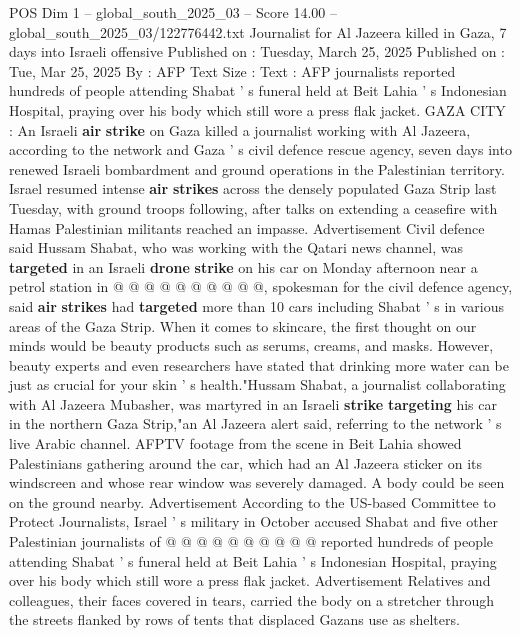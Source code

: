 \begin{textsample}{POS Dim 1 – global\_south\_2025\_03 – Score 14.00 – global\_south\_2025\_03/122776442.txt}  \label{ex:f1_pos_299}
Journalist for Al Jazeera killed in Gaza, 7 days into Israeli offensive Published on : Tuesday, March 25, 2025 Published on : Tue, Mar 25, 2025 By : AFP Text Size : Text : AFP journalists reported hundreds of people attending Shabat ' s funeral held at Beit Lahia ' s Indonesian Hospital, praying over his body which still wore a press flak jacket.
GAZA CITY : An Israeli \textbf{air} \textbf{strike} on Gaza killed a journalist working with Al Jazeera, according to the network and Gaza ' s civil defence rescue agency, seven days into renewed Israeli bombardment and ground operations in the Palestinian territory.
Israel resumed intense \textbf{air} \textbf{strikes} across the densely populated Gaza Strip last Tuesday, with ground troops following, after talks on extending a ceasefire with Hamas Palestinian militants reached an impasse.
Advertisement Civil defence said Hussam Shabat, who was working with the Qatari news channel, was \textbf{targeted} in an Israeli \textbf{drone} \textbf{strike} on his car on Monday afternoon near a petrol station in @ @ @ @ @ @ @ @ @ @, spokesman for the civil defence agency, said \textbf{air} \textbf{strikes} had \textbf{targeted} more than 10 cars including Shabat ' s in various areas of the Gaza Strip.
When it comes to skincare, the first thought on our minds would be beauty products such as serums, creams, and masks.
However, beauty experts and even researchers have stated that drinking more water can be just as crucial for your skin ' s health."Hussam Shabat, a journalist collaborating with Al Jazeera Mubasher, was martyred in an Israeli \textbf{strike} \textbf{targeting} his car in the northern Gaza Strip,"an Al Jazeera alert said, referring to the network ' s live Arabic channel.
AFPTV footage from the scene in Beit Lahia showed Palestinians gathering around the car, which had an Al Jazeera sticker on its windscreen and whose rear window was severely damaged.
A body could be seen on the ground nearby.
Advertisement According to the US-based Committee to Protect Journalists, Israel ' s military in October accused Shabat and five other Palestinian journalists of @ @ @ @ @ @ @ @ @ @ reported hundreds of people attending Shabat ' s funeral held at Beit Lahia ' s Indonesian Hospital, praying over his body which still wore a press flak jacket.
Advertisement Relatives and colleagues, their faces covered in tears, carried the body on a stretcher through the streets flanked by rows of tents that displaced Gazans use as shelters.

\end{textsample}
